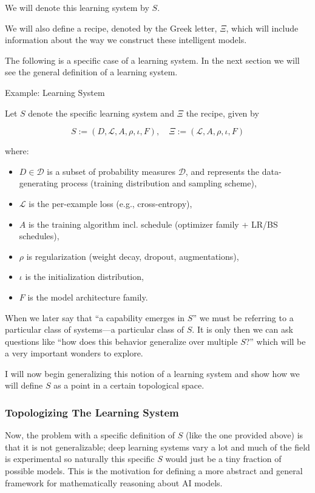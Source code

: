 \documentclass[12pt]{article}
\begin{document}
We will denote this learning system by $S$.

We will also define a recipe, denoted by the Greek letter, $\Xi$, which will include information about the way we construct these intelligent models.

The following is a specific case of a learning system. In the next section we will see the general definition of a learning system.

\begin{statementbox}{Example: Learning System}

Let $S$ denote the specific learning system and $\Xi$ the recipe, given by

\[
S :=  (D,\mathcal L,A,\rho,\iota,F),\quad \Xi:= (\mathcal L,A,\rho,\iota,F)
\]

where:

\begin{itemize}
    \item $D\in \mathcal D$ is a subset of probability measures $\mathcal D$, and represents the data-generating process (training distribution and sampling scheme),

    \item $\mathcal L$ is the per-example loss (e.g., cross-entropy),
    \item $A$ is the training algorithm incl. schedule (optimizer family + LR/BS schedules),
    \item $\rho$ is regularization (weight decay, dropout, augmentations),
    \item $\iota$ is the initialization distribution,
    \item $F$ is the model architecture family.
    
\end{itemize}

\end{statementbox}

When we later say that “a capability emerges in $S$” we must be referring to a particular class of systems—a particular class of $S$. It is only then we can ask questions like “how does this behavior generalize over multiple $S$?” which will be a very important wonders to explore.

I will now begin generalizing this notion of a learning system and show how we will define $S$ as a point in a certain topological space.

\subsubsection{Topologizing The Learning System}
Now, the problem with a specific definition of $S$ (like the one provided above) is that it is not generalizable; deep learning systems vary a lot and much of the field is experimental so naturally this specific $S$ would just be a tiny fraction of possible models. This is the motivation for defining a more abstract and general framework for mathematically reasoning about AI models.  
\end{document}

